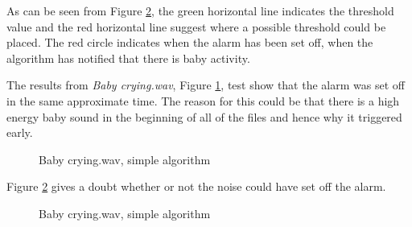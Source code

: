 As can be seen from Figure \ref{fig:bc1_simp_crop}, the green horizontal line indicates the threshold value and the red horizontal line
suggest where a possible threshold could be placed. The red circle indicates when the alarm has been set off, when the algorithm has
notified that there is baby activity.

The results from \emph{Baby crying.wav}, Figure \ref{fig:bc1_simp}, test show that the alarm was set off in the same approximate time.
The reason for this could be that there is a high energy baby sound in the beginning of all of the files and hence why it triggered early.

\begin{figure}[H]
  \centering
  \caption{Baby crying.wav, simple algorithm}
  \label{fig:bc1_simp}
\end{figure}

Figure \ref{fig:bc1_simp_crop} gives a doubt whether or not the noise could have set off the alarm.

\begin{figure}[H]
  \centering
  \caption{Baby crying.wav, simple algorithm}
  \label{fig:bc1_simp_crop}
\end{figure}

